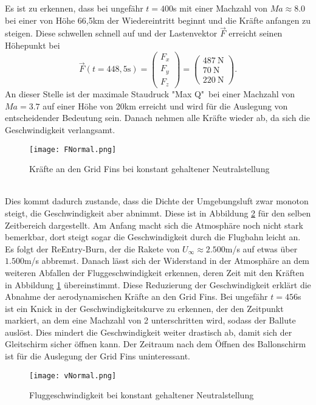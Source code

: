Es ist zu erkennen, dass bei ungefähr $t=400$s mit einer Machzahl von $Ma \approx 8.0$ bei einer von Höhe 66,5km  der Wiedereintritt beginnt und die Kräfte anfangen zu steigen. Diese schwellen schnell auf und der Lastenvektor $\vec{F}$ erreicht seinen Höhepunkt bei
\begin{equation}
	\vec{F}(t=448,5\mathrm{s})=
		\left(\begin{array}{c}F_{x}\\F_y\\F_z\end{array}\right)
			=\left(\begin{array}{r}487\mathrm{\ N}\\70\mathrm{\ N}\\220\mathrm{\ N}\end{array}\right).
\end{equation}
An dieser Stelle ist der maximale Staudruck "Max Q"\ bei einer Machzahl von $Ma = 3.7$ auf einer Höhe von 20km erreicht und wird für die Auslegung von entscheidender Bedeutung sein. Danach nehmen alle Kräfte wieder ab, da sich die Geschwindigkeit verlangsamt. 
\begin{figure}[h]
	\centering
	\texttt{[image: FNormal.png]}
	\caption{Kräfte an den Grid Fins bei konstant gehaltener Neutralstellung}
	\label{abb_KraefteNormal}
\end{figure}\\
Dies kommt dadurch zustande, dass die Dichte der Umgebungsluft zwar monoton steigt, die Geschwindigkeit aber abnimmt. Diese ist in Abbildung \ref{abb_vNormal} für den selben Zeitbereich dargestellt. Am Anfang macht sich die Atmosphäre noch nicht stark bemerkbar, dort steigt sogar die Geschwindigkeit durch die Flugbahn leicht an. Es folgt der ReEntry-Burn, der die Rakete von $U_\infty \approx 2.500$m/s auf etwas über $1.500$m/s abbremst. Danach lässt sich der Widerstand in der Atmosphäre an dem weiteren Abfallen der Fluggeschwindigkeit erkennen, deren Zeit mit den Kräften in Abbildung \ref{abb_KraefteNormal} übereinstimmt. Diese Reduzierung der Geschwindigkeit erklärt die Abnahme der aerodynamischen Kräfte an den Grid Fins. Bei ungefähr $t=456$s ist ein Knick in der Geschwindigkeitskurve zu erkennen, der den Zeitpunkt markiert, an dem eine Machzahl von 2 unterschritten wird, sodass der Ballute auslöst. Dies mindert die Geschwindigkeit weiter drastisch ab, damit sich der Gleitschirm sicher öffnen kann. Der Zeitraum nach dem Öffnen des Ballonschirm ist für die Auslegung der Grid Fins uninteressant.
\begin{figure}[h]
	\centering
	\texttt{[image: vNormal.png]}
	\caption{Fluggeschwindigkeit bei konstant gehaltener Neutralstellung}
	\label{abb_vNormal}
\end{figure}\\~\\
